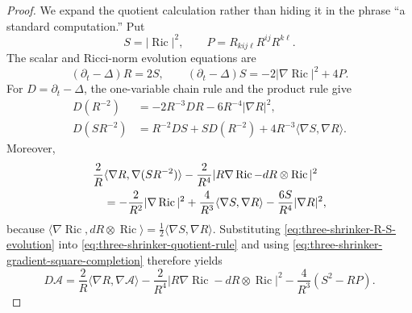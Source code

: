 \documentclass[10pt]{coll-l}
\theoremstyle{definition}
\theoremstyle{remark}
\numberwithin{section}{chapter}
\numberwithin{equation}{chapter}
\newcommand{\Ric}{\operatorname{Ric}}
\begin{document}
\begin{proof}
We expand the quotient calculation rather than hiding it in the phrase
``a standard computation.''  Put
\[
 S=|\Ric|^2,
 \qquad
 P=R_{kij\ell}R^{ij}R^{k\ell}.
\]
The scalar and Ricci-norm evolution equations are
\begin{equation}
 (\partial_t-\Delta)R=2S,
 \qquad
 (\partial_t-\Delta)S=-2|\nabla\Ric|^2+4P.              \label{eq:three-shrinker-R-S-evolution}
\end{equation}
For $D=\partial_t-\Delta$, the one-variable chain rule and the product
rule give
\begin{align}
 D(R^{-2})
   &=-2R^{-3}DR-6R^{-4}|\nabla R|^2,                    \label{eq:three-shrinker-inverse-square}\\
 D(SR^{-2})
   &=R^{-2}DS+S D(R^{-2})
       +4R^{-3}\langle\nabla S,\nabla R\rangle.          \label{eq:three-shrinker-quotient-rule}
\end{align}
Moreover,
\begin{align}
 &\frac2R\langle\nabla R,\nabla(SR^{-2})\rangle
   -\frac2{R^4}|R\nabla\Ric-dR\otimes\Ric|^2           \notag\\
 &\quad=-\frac2{R^2}|\nabla\Ric|^2
      +\frac4{R^3}\langle\nabla S,\nabla R\rangle
      -\frac{6S}{R^4}|\nabla R|^2,                    \label{eq:three-shrinker-gradient-square-completion}
\end{align}
because
$\langle\nabla\Ric,dR\otimes\Ric\rangle
=\frac12\langle\nabla S,\nabla R\rangle$.
Substituting \eqref{eq:three-shrinker-R-S-evolution} into
\eqref{eq:three-shrinker-quotient-rule} and using
\eqref{eq:three-shrinker-gradient-square-completion} therefore yields
\begin{equation}
 D\mathcal A
  =\frac2R\langle\nabla R,\nabla\mathcal A\rangle
   -\frac2{R^4}|R\nabla\Ric-dR\otimes\Ric|^2
   -\frac4{R^3}(S^2-RP).                                \label{eq:three-shrinker-anisotropy-before-algebra}
\end{equation}


\end{proof}
\end{document}

